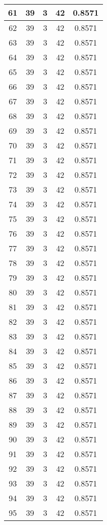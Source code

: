\documentclass[letterpaper, 12pt]{article}
\begin{document}
\begin{longtable}{|c|c|c|c|c|}
61 & 39 & 3 & 42 & 0.8571 \\
\hline
62 & 39 & 3 & 42 & 0.8571 \\
\hline
63 & 39 & 3 & 42 & 0.8571 \\
\hline
64 & 39 & 3 & 42 & 0.8571 \\
\hline
65 & 39 & 3 & 42 & 0.8571 \\
\hline
66 & 39 & 3 & 42 & 0.8571 \\
\hline
67 & 39 & 3 & 42 & 0.8571 \\
\hline
68 & 39 & 3 & 42 & 0.8571 \\
\hline
69 & 39 & 3 & 42 & 0.8571 \\
\hline
70 & 39 & 3 & 42 & 0.8571 \\
\hline
71 & 39 & 3 & 42 & 0.8571 \\
\hline
72 & 39 & 3 & 42 & 0.8571 \\
\hline
73 & 39 & 3 & 42 & 0.8571 \\
\hline
74 & 39 & 3 & 42 & 0.8571 \\
\hline
75 & 39 & 3 & 42 & 0.8571 \\
\hline
76 & 39 & 3 & 42 & 0.8571 \\
\hline
77 & 39 & 3 & 42 & 0.8571 \\
\hline
78 & 39 & 3 & 42 & 0.8571 \\
\hline
79 & 39 & 3 & 42 & 0.8571 \\
\hline
80 & 39 & 3 & 42 & 0.8571 \\
\hline
81 & 39 & 3 & 42 & 0.8571 \\
\hline
82 & 39 & 3 & 42 & 0.8571 \\
\hline
83 & 39 & 3 & 42 & 0.8571 \\
\hline
84 & 39 & 3 & 42 & 0.8571 \\
\hline
85 & 39 & 3 & 42 & 0.8571 \\
\hline
86 & 39 & 3 & 42 & 0.8571 \\
\hline
87 & 39 & 3 & 42 & 0.8571 \\
\hline
88 & 39 & 3 & 42 & 0.8571 \\
\hline
89 & 39 & 3 & 42 & 0.8571 \\
\hline
90 & 39 & 3 & 42 & 0.8571 \\
\hline
91 & 39 & 3 & 42 & 0.8571 \\
\hline
92 & 39 & 3 & 42 & 0.8571 \\
\hline
93 & 39 & 3 & 42 & 0.8571 \\
\hline
94 & 39 & 3 & 42 & 0.8571 \\
\hline
95 & 39 & 3 & 42 & 0.8571 \\

\end{longtable}
\end{document}

